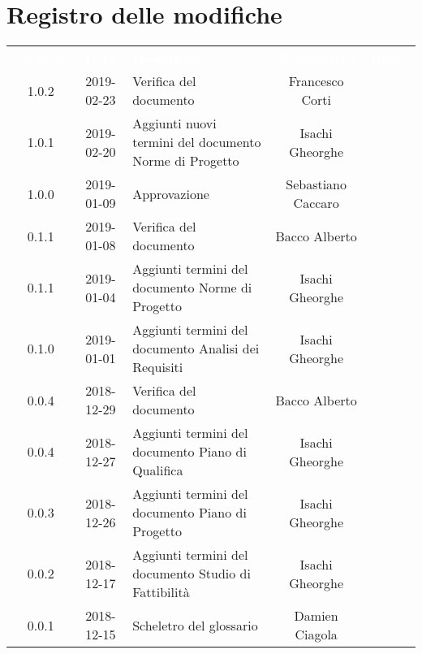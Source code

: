 
\section*{Registro delle modifiche}
{
	\renewcommand{\arraystretch}{1.5}
	\centering
	\begin{longtable}{ c c  C{4cm}  c  c }
		
		\textcolor{white}{\textbf{Versione}} & \textcolor{white}{\textbf{Data}} & \textcolor{white}{\textbf{Descrizione}} & \textcolor{white}{\textbf{Nominativo}} & \textcolor{white}{\textbf{Ruolo}}\\
		
		1.0.2 & 2019-02-23 & Verifica del documento &  Francesco Corti & \ver{}\\
		
		1.0.1 & 2019-02-20 & Aggiunti nuovi termini del documento Norme di Progetto & Isachi Gheorghe &\reda{}\\
		
		1.0.0 & 2019-01-09 & Approvazione & Sebastiano Caccaro & \Res{}\\
						
		0.1.1 & 2019-01-08 & Verifica del documento & Bacco Alberto & \ver{}\\
		
		0.1.1 & 2019-01-04 & Aggiunti termini del documento Norme di Progetto & Isachi Gheorghe &\reda{}\\
		
		0.1.0 & 2019-01-01 & Aggiunti termini del documento Analisi dei Requisiti & Isachi Gheorghe &\reda{}\\
		
		0.0.4 & 2018-12-29 & Verifica del documento & Bacco Alberto & \ver{}\\
				
		0.0.4 & 2018-12-27 & Aggiunti termini del documento Piano di Qualifica & Isachi Gheorghe &\reda{}\\
				
		0.0.3 & 2018-12-26 &Aggiunti termini del documento Piano di Progetto & Isachi Gheorghe & \reda{}\\
				
		0.0.2 & 2018-12-17 & Aggiunti termini del documento Studio di Fattibilità & Isachi Gheorghe &\reda{}\\
		
		0.0.1 & 2018-12-15 & Scheletro del glossario & Damien Ciagola & \reda{}\\
		
	\end{longtable}

}